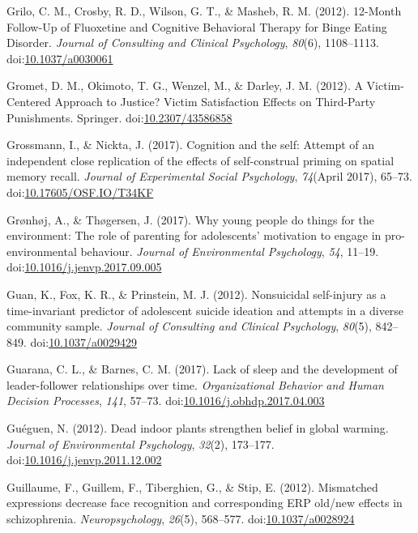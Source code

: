 \documentclass[english,man]{apa6}
\theoremstyle{definition}
\theoremstyle{definition}
\theoremstyle{definition}
\theoremstyle{remark}
\begin{document}
\hypertarget{ref-Grilo2012}{}
Grilo, C. M., Crosby, R. D., Wilson, G. T., \& Masheb, R. M. (2012).
12-Month Follow-Up of Fluoxetine and Cognitive Behavioral Therapy for
Binge Eating Disorder. \emph{Journal of Consulting and Clinical
Psychology}, \emph{80}(6), 1108--1113.
doi:\href{https://doi.org/10.1037/a0030061}{10.1037/a0030061}

\hypertarget{ref-Gromet2012}{}
Gromet, D. M., Okimoto, T. G., Wenzel, M., \& Darley, J. M. (2012). A
Victim-Centered Approach to Justice? Victim Satisfaction Effects on
Third-Party Punishments. Springer.
doi:\href{https://doi.org/10.2307/43586858}{10.2307/43586858}

\hypertarget{ref-Grossmann2017}{}
Grossmann, I., \& Nickta, J. (2017). Cognition and the self: Attempt of
an independent close replication of the effects of self-construal
priming on spatial memory recall. \emph{Journal of Experimental Social
Psychology}, \emph{74}(April 2017), 65--73.
doi:\href{https://doi.org/10.17605/OSF.IO/T34KF}{10.17605/OSF.IO/T34KF}

\hypertarget{ref-Gruxf8nhuxf8j2017}{}
Grønhøj, A., \& Thøgersen, J. (2017). Why young people do things for the
environment: The role of parenting for adolescents' motivation to engage
in pro-environmental behaviour. \emph{Journal of Environmental
Psychology}, \emph{54}, 11--19.
doi:\href{https://doi.org/10.1016/j.jenvp.2017.09.005}{10.1016/j.jenvp.2017.09.005}

\hypertarget{ref-Guan2012}{}
Guan, K., Fox, K. R., \& Prinstein, M. J. (2012). Nonsuicidal
self-injury as a time-invariant predictor of adolescent suicide ideation
and attempts in a diverse community sample. \emph{Journal of Consulting
and Clinical Psychology}, \emph{80}(5), 842--849.
doi:\href{https://doi.org/10.1037/a0029429}{10.1037/a0029429}

\hypertarget{ref-Guarana2017}{}
Guarana, C. L., \& Barnes, C. M. (2017). Lack of sleep and the
development of leader-follower relationships over time.
\emph{Organizational Behavior and Human Decision Processes}, \emph{141},
57--73.
doi:\href{https://doi.org/10.1016/j.obhdp.2017.04.003}{10.1016/j.obhdp.2017.04.003}

\hypertarget{ref-Gueguen2012}{}
Guéguen, N. (2012). Dead indoor plants strengthen belief in global
warming. \emph{Journal of Environmental Psychology}, \emph{32}(2),
173--177.
doi:\href{https://doi.org/10.1016/j.jenvp.2011.12.002}{10.1016/j.jenvp.2011.12.002}

\hypertarget{ref-Guillaume2012}{}
Guillaume, F., Guillem, F., Tiberghien, G., \& Stip, E. (2012).
Mismatched expressions decrease face recognition and corresponding ERP
old/new effects in schizophrenia. \emph{Neuropsychology}, \emph{26}(5),
568--577. doi:\href{https://doi.org/10.1037/a0028924}{10.1037/a0028924}
\end{document}
